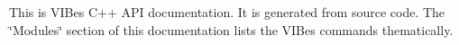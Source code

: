 This is V\+I\+Bes C++ A\+PI documentation. It is generated from source code. The \char`\"{}\+Modules\char`\"{} section of this documentation lists the V\+I\+Bes commands thematically. 